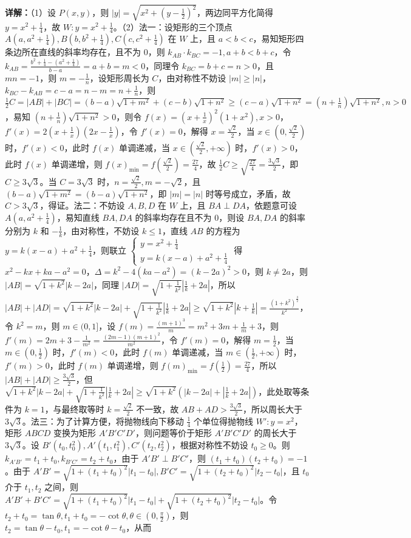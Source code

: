 \begin{question}[points=12]
\begin{solution}
\textbf{详解：}（1）设 $P(x,y)$，则 $|y|=\sqrt{x^2+(y-\frac{1}{2})^2}$，两边同平方化简得 $y=x^2+\frac{1}{4}$，故 $W: y=x^2+\frac{1}{4}$。（2）法一：设矩形的三个顶点 $A(a,a^2+\frac{1}{4}), B(b,b^2+\frac{1}{4}), C(c,c^2+\frac{1}{4})$ 在 $W$ 上，且 $a<b<c$，易知矩形四条边所在直线的斜率均存在，且不为 0，则 $k_{AB}\cdot k_{BC}=-1, a+b<b+c$，令 $k_{AB}=\frac{b^2+\frac{1}{4}-(a^2+\frac{1}{4})}{b-a}=a+b=m<0$，同理令 $k_{BC}=b+c=n>0$，且 $mn=-1$，则 $m=-\frac{1}{n}$，设矩形周长为 $C$，由对称性不妨设 $|m|\geq|n|$，$k_{BC}-k_{AB}=c-a=n-m=n+\frac{1}{n}$，则 $\frac{1}{2}C=|AB|+|BC|=(b-a)\sqrt{1+m^2}+(c-b)\sqrt{1+n^2}\geq (c-a)\sqrt{1+n^2}=(n+\frac{1}{n})\sqrt{1+n^2}, n>0$，易知 $(n+\frac{1}{n})\sqrt{1+n^2}>0$，则令 $f(x)=(x+\frac{1}{x})^2(1+x^2), x>0$，$f'(x)=2(x+\frac{1}{x})(2x-\frac{1}{x})$，令 $f'(x)=0$，解得 $x=\frac{\sqrt{2}}{2}$，当 $x\in(0,\frac{\sqrt{2}}{2})$ 时，$f'(x)<0$，此时 $f(x)$ 单调递减，当 $x\in(\frac{\sqrt{2}}{2},+\infty)$ 时，$f'(x)>0$，此时 $f(x)$ 单调递增，则 $f(x)_{\min}=f(\frac{\sqrt{2}}{2})=\frac{27}{4}$，故 $\frac{1}{2}C\geq \sqrt{\frac{27}{4}}=\frac{3\sqrt{3}}{2}$，即 $C\geq 3\sqrt{3}$。当 $C=3\sqrt{3}$ 时，$n=\frac{\sqrt{2}}{2}, m=-\sqrt{2}$，且 $(b-a)\sqrt{1+m^2}=(b-a)\sqrt{1+n^2}$，即 $|m|=|n|$ 时等号成立，矛盾，故 $C>3\sqrt{3}$，得证。法二：不妨设 $A,B,D$ 在 $W$ 上，且 $BA\perp DA$，依题意可设 $A(a,a^2+\frac{1}{4})$，易知直线 $BA, DA$ 的斜率均存在且不为 0，则设 $BA, DA$ 的斜率分别为 $k$ 和 $-\frac{1}{k}$，由对称性，不妨设 $k\leq 1$，直线 $AB$ 的方程为 $y=k(x-a)+a^2+\frac{1}{4}$，则联立 $\begin{cases} y=x^2+\frac{1}{4} \\ y=k(x-a)+a^2+\frac{1}{4} \end{cases}$ 得 $x^2-kx+ka-a^2=0$，$\Delta=k^2-4(ka-a^2)=(k-2a)^2>0$，则 $k\neq 2a$，则 $|AB|=\sqrt{1+k^2}|k-2a|$，同理 $|AD|=\sqrt{1+\frac{1}{k^2}}|\frac{1}{k}+2a|$，所以 $|AB|+|AD|=\sqrt{1+k^2}|k-2a|+\sqrt{1+\frac{1}{k^2}}|\frac{1}{k}+2a|\geq \sqrt{1+k^2}|k+\frac{1}{k}|=\frac{(1+k^2)^{\frac{3}{2}}}{k^2}$，令 $k^2=m$，则 $m\in(0,1]$，设 $f(m)=\frac{(m+1)^3}{m}=m^2+3m+\frac{1}{m}+3$，则 $f'(m)=2m+3-\frac{1}{m^2}=\frac{(2m-1)(m+1)^2}{m^2}$，令 $f'(m)=0$，解得 $m=\frac{1}{2}$，当 $m\in(0,\frac{1}{2})$ 时，$f'(m)<0$，此时 $f(m)$ 单调递减，当 $m\in(\frac{1}{2},+\infty)$ 时，$f'(m)>0$，此时 $f(m)$ 单调递增，则 $f(m)_{\min}=f(\frac{1}{2})=\frac{27}{4}$，所以 $|AB|+|AD|\geq \frac{3\sqrt{3}}{2}$，但 $\sqrt{1+k^2}|k-2a|+\sqrt{1+\frac{1}{k^2}}|\frac{1}{k}+2a|\geq \sqrt{1+k^2}(|k-2a|+|\frac{1}{k}+2a|)$，此处取等条件为 $k=1$，与最终取等时 $k=\frac{\sqrt{2}}{2}$ 不一致，故 $AB+AD>\frac{3\sqrt{3}}{2}$，所以周长大于 $3\sqrt{3}$。法三：为了计算方便，将抛物线向下移动 $\frac{1}{4}$ 个单位得抛物线 $W': y=x^2$，矩形 $ABCD$ 变换为矩形 $A'B'C'D'$，则问题等价于矩形 $A'B'C'D'$ 的周长大于 $3\sqrt{3}$。设 $B'(t_0,t_0^2), A'(t_1,t_1^2), C'(t_2,t_2^2)$，根据对称性不妨设 $t_0\geq 0$。则 $k_{A'B'}=t_1+t_0, k_{B'C'}=t_2+t_0$，由于 $A'B'\perp B'C'$，则 $(t_1+t_0)(t_2+t_0)=-1$。由于 $A'B'=\sqrt{1+(t_1+t_0)^2}|t_1-t_0|, B'C'=\sqrt{1+(t_2+t_0)^2}|t_2-t_0|$，且 $t_0$ 介于 $t_1,t_2$ 之间，则 $A'B'+B'C'=\sqrt{1+(t_1+t_0)^2}|t_1-t_0|+\sqrt{1+(t_2+t_0)^2}|t_2-t_0|$。令 $t_2+t_0=\tan\theta, t_1+t_0=-\cot\theta, \theta\in(0,\frac{\pi}{2})$，则 $t_2=\tan\theta-t_0, t_1=-\cot\theta-t_0$，从而 
\end{solution}
\end{question}
